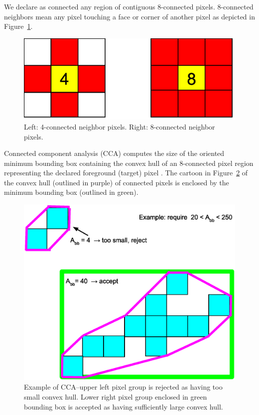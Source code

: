 We declare as connected any region of contiguous 8-connected pixels.
8-connected neighbors mean any pixel touching a face or corner of another pixel as depicted in Figure~\ref{fig:8conn}.
\begin{figure}\centering
	\includegraphics[width=0.8\linewidth,trim=0 0 10 0,clip]{gfx/4conn8conn}
	\caption{Left: 4-connected neighbor pixels. Right: 8-connected neighbor pixels.}\label{fig:8conn}
\end{figure}
Connected component analysis (CCA) computes the size of the oriented minimum bounding box containing the convex hull of an 8-connected pixel region representing the declared foreground (target) pixel \citep{gonzalezwoods}. 
The cartoon in Figure~\ref{fig:connblob} of the convex hull (outlined in purple) of connected pixels is enclosed by the minimum bounding box (outlined in green).
\begin{figure}\centering
	\includegraphics[width=\linewidth,trim= 10 0 10 0,clip]{gfx/connblobcartoon}
	\caption{Example of CCA--upper left pixel group is rejected as having too small convex hull.  Lower right pixel group enclosed in green bounding box is accepted as having sufficiently large convex hull.}\label{fig:connblob}
\end{figure}
